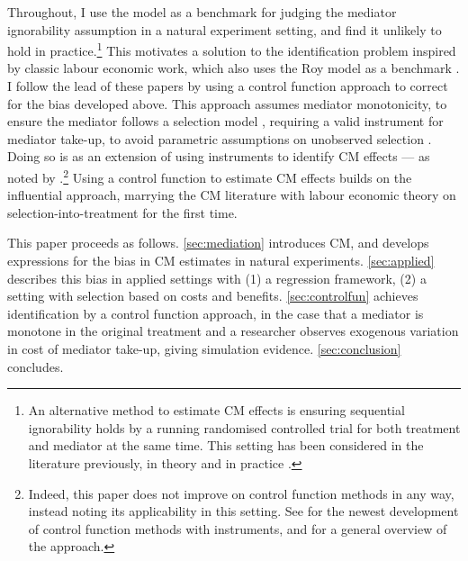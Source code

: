 Throughout, I use the \cite{roy1951some} model as a benchmark for judging the \cite{imai2010identification} mediator ignorability assumption in a natural experiment setting, and find it unlikely to hold in practice.\footnote{
    An alternative method to estimate CM effects is ensuring sequential ignorability holds by a running randomised controlled trial for both treatment and mediator at the same time.
    This setting has been considered in the literature previously, in theory \citep{imai2013experimental} and in practice \citep{ludwig2011mechanism}.
}
This motivates a solution to the identification problem inspired by classic labour economic work, which also uses the Roy model as a benchmark \citep{heckman1979sample,heckman1990empirical}.
I follow the lead of these papers by using a control function approach to correct for the bias developed above.
This approach assumes mediator monotonicity, to ensure the mediator follows a selection model \citep{vytlacil2002independence}, requiring a valid instrument for mediator take-up, to avoid parametric assumptions on unobserved selection \citep{heckman2004using,florens2008identification}.
Doing so is as an extension of using instruments to identify CM effects --- as noted by \cite{frolich2017direct}.\footnote{
    Indeed, this paper does not improve on control function methods in any way, instead noting its applicability in this setting.
    See \cite{frolich2017direct} for the newest development of control function methods with instruments, and \cite{imbens2007nonadditive} for a general overview of the approach.
}
Using a control function to estimate CM effects builds on the influential \cite{imai2010identification} approach, marrying the CM literature with labour economic theory on selection-into-treatment for the first time. 

This paper proceeds as follows.
\autoref{sec:mediation} introduces CM, and develops expressions for the bias in CM estimates in natural experiments.
\autoref{sec:applied} describes this bias in applied settings with (1) a regression framework, (2) a setting with selection based on costs and benefits.
\autoref{sec:controlfun} achieves identification by a control function approach,
in the case that a mediator is monotone in the original treatment and a researcher observes exogenous variation in cost of mediator take-up, giving simulation evidence.
\autoref{sec:conclusion} concludes.
